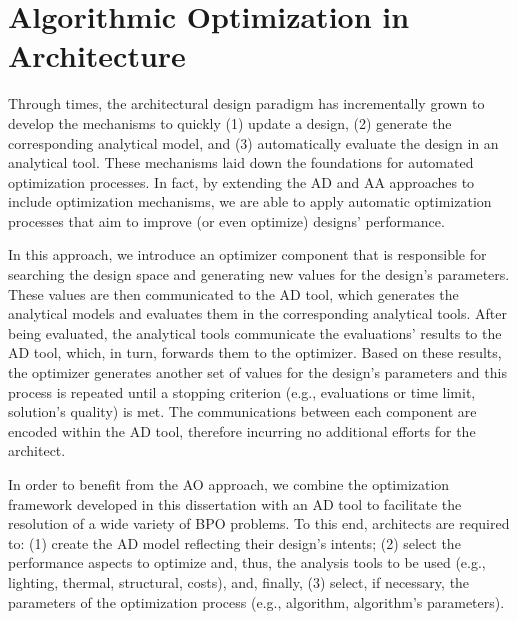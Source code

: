 \section{Algorithmic Optimization in Architecture}
\label{sec: Methodology}

Through times, the architectural design paradigm has incrementally grown to develop the mechanisms to quickly (1) update a design, (2) generate the corresponding analytical model, and (3) automatically evaluate the design in an analytical tool. These mechanisms laid down the foundations for automated optimization processes. In fact, by extending the \ac{AD} and \ac{AA} approaches to include optimization mechanisms, we are able to apply automatic optimization processes that aim to improve (or even optimize) designs' performance. 

In this approach, we introduce an optimizer component that is responsible for searching the design space and generating new values for the design's parameters. These values are then communicated to the \ac{AD} tool, which generates the analytical models and evaluates them in the corresponding analytical tools. After being evaluated, the analytical tools communicate the evaluations' results to the \ac{AD} tool, which, in turn, forwards them to the optimizer. Based on these results, the optimizer generates another set of values for the design's parameters and this process is repeated until a stopping criterion (e.g., evaluations or time limit, solution's quality) is met. The communications between each component are encoded within the \ac{AD} tool, therefore incurring no additional efforts for the architect.


In order to benefit from the \ac{AO} approach, we combine the optimization framework developed in this dissertation with an \ac{AD} tool to facilitate the resolution of a wide variety of \ac{BPO} problems. To this end, architects are required to: (1) create the \ac{AD} model reflecting their design's intents; (2) select the performance aspects to optimize and, thus, the analysis tools to be used (e.g., lighting, thermal, structural, costs), and, finally, (3) select, if necessary, the parameters of the optimization process (e.g., algorithm, algorithm's parameters).

